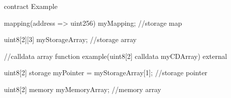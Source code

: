 \begin{soliditybox}
contract Example {
  mapping(address => uint256) myMapping; //storage map
    
  uint8[2][3] myStorageArray; //storage array

  //calldata array
  function example(uint8[2] calldata myCDArray) external {
    uint8[2] storage myPointer = myStorageArray[1]; //storage pointer
    
    uint8[2] memory myMemoryArray; //memory array
  }
}
\end{soliditybox}